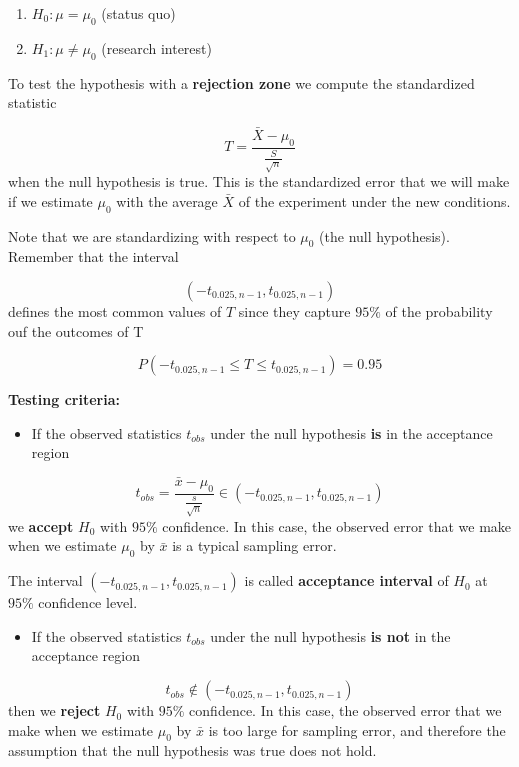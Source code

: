 \documentclass[
]{book}
\providecommand{\tightlist}{%
  \setlength{\itemsep}{0pt}\setlength{\parskip}{0pt}}
\begin{document}
\begin{enumerate}
\def\labelenumi{\alph{enumi}.}
\tightlist
\item
  \(H_0:\mu = \mu_0\) (status quo)
\item
  \(H_1:\mu \neq \mu_0\) (research interest)
\end{enumerate}

To test the hypothesis with a \textbf{rejection zone} we compute the standardized statistic

\[T=\frac{\bar{X}-\mu_0}{\frac{S}{\sqrt{n}}}\]
when the null hypothesis is true. This is the standardized error that we will make if we estimate \(\mu_0\) with the average \(\bar{X}\) of the experiment under the new conditions.

Note that we are standardizing with respect to \(\mu_0\) (the null hypothesis). Remember that the interval

\[(-t_{0.025, n-1}, t_{0.025, n-1})\]
defines the most common values of \(T\) since they capture \(95\%\) of the probability ouf the outcomes of T

\[P(-t_{0.025, n-1} \leq T \leq t_{0.025, n-1})=0.95\]

\textbf{Testing criteria:}

\begin{itemize}
\tightlist
\item
  If the observed statistics \(t_{obs}\) under the null hypothesis \textbf{is} in the acceptance region
\end{itemize}

\[t_{obs}=\frac{\bar{x}-\mu_0}{\frac{s}{\sqrt{n}}} \in (-t_{0.025, n-1}, t_{0.025, n-1})\]
we \textbf{accept} \(H_0\) with \(95\%\) confidence. In this case, the observed error that we make when we estimate \(\mu_0\) by \(\bar{x}\) is a typical sampling error.

The interval \((-t_{0.025, n-1}, t_{0.025, n-1})\) is called \textbf{acceptance interval} of \(H_0\) at \(95\%\) confidence level.

\begin{itemize}
\tightlist
\item
  If the observed statistics \(t_{obs}\) under the null hypothesis \textbf{is not} in the acceptance region
\end{itemize}

\[t_{obs} \notin (-t_{0.025, n-1}, t_{0.025, n-1})\] then we \textbf{reject} \(H_0\) with \(95\%\) confidence. In this case, the observed error that we make when we estimate \(\mu_0\) by \(\bar{x}\) is too large for sampling error, and therefore the assumption that the null hypothesis was true does not hold.
\end{document}
